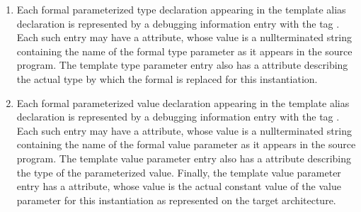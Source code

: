 \begin{enumerate}[1.]
\item Each formal parameterized type declaration appearing
in the template alias declaration is represented
by a debugging information entry with the tag
. Each such entry may have
a  attribute, whose value is a null\dash terminated
string containing the name of the formal type parameter as it
appears in the source program. The template type parameter
entry also has a  attribute describing the actual
type by which the formal is replaced for this instantiation.

\item Each formal parameterized value declaration
appearing in the template alias declaration is
represented by a debugging information entry with the tag
. Each such entry may have
a  attribute, whose value is a null\dash terminated
string containing the name of the formal value parameter
as it appears in the source program. The template value
parameter entry also has a  attribute describing
the type of the parameterized value. Finally, the template
value parameter entry has a  attribute, whose
value is the actual constant value of the value parameter for
this instantiation as represented on the target architecture.
\end{enumerate}

